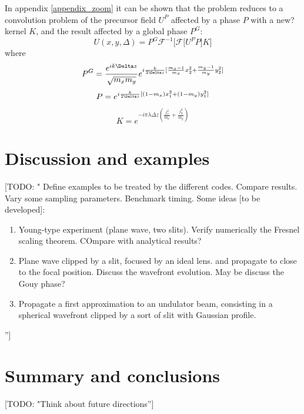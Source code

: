 \documentclass{iucr}              %
\newcommand{\todo}[1]{{\color{red}[TODO: "#1'']}}
\newcommand{\inred}[1]{{\color{red}#1}}
\begin{document}
In appendix \ref{appendix_zoom} it can be shown that the problem reduces to a convolution problem of the precursor field $U^P$ affected by a phase $P$ with a \inred{new?} kernel $K$, and the result affected by a global phase $P^G$: 
\begin{equation}
U(x, y, \Delta) = P^G \mathcal{F}^{-1}\Big[\mathcal{F}\big[U^P P \big] K \Big]
\end{equation}
where
\begin{equation}
P^G =  \frac { e^{ik\Delta z }}{\sqrt{m_x m_y} }e^{i \frac{k}{2 \Delta z} [\frac{m_x - 1}{m_x}x_2^2 + \frac{m_y - 1}{m_y}y_2^2]}  \\
\end{equation}
\begin{equation}
P = e^{i \frac{k}{2 \Delta z} [(1-m_x)x_1^2 + (1-m_y)y_1^2]} \\
\end{equation}
\begin{equation}
K = e^{-i \pi \lambda \Delta z (\frac{f_x^2}{m_x} +\frac{f_y^2}{m_y})}
\end{equation}


\section{Discussion and examples}

\todo{
Define examples to be treated by the different codes. Compare results. Vary some sampling parameters. Benchmark timing. Some ideas [to be developed]: 

\begin{enumerate}
 \item Young-type experiment (plane wave, two slits). Verify numerically the Fresnel scaling theorem. COmpare with analytical results? 
 \item Plane wave clipped by a slit, focused by an ideal lens. and propagate to close to the focal position. Discuss the 
 wavefront evolution. May be discuss the Gouy phase?
 \item Propagate a first approximation to an undulator beam, consisting in a spherical wavefront clipped by a sort of slit with Gaussian profile.  
\end{enumerate}
}


\section{Summary and conclusions}

\todo{Think about future directions}
\end{document}
